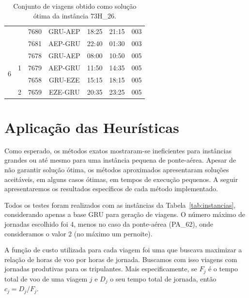 \begin{table}[htb]
\begin{center}
{\begin{tabular}{|c|c|ccccc|}
			&	&	7680 & GRU-AEP & 18:25 & 21:15 & 003 \\
			&	&	7681 & AEP-GRU & 22:40 & 01:30 & 003 \\ \hline \hline
			\multirow{4}{*}{6} & \multirow{3}{*}{1}  
				& 7678 & GRU-AEP & 08:00 & 10:50 & 005 \\
			& & 7679 & AEP-GRU & 11:50 & 14:35 & 005 \\
			&	& 7658 & GRU-EZE & 15:15 & 18:15 & 005 \\ \cline{2-7}
                           	 & \multirow{1}{*}{2}
				& 7659 & EZE-GRU & 20:35 & 23:25 & 005 \\ \hline
		\end{tabular}}
		\caption{Conjunto de viagens obtido como solução ótima da instância 73H\_26.}
		\label{tab:pairings}
	\end{center}
\end{table}


\section{Aplicação das Heurísticas}
\label{sec:aplicacao_heuristicas}

Como esperado, os métodos exatos mostraram-se ineficientes para instâncias grandes ou até mesmo para
uma instância pequena de ponte-aérea. Apesar de não garantir solução ótima, os métodos aproximados
apresentaram soluções aceitáveis, em alguns casos ótimas, em tempos de execução pequenos. A seguir
apresentaremos os resultados específicos de cada método implementado.

Todos os testes foram realizados com as instâncias da Tabela~\ref{tab:instancias}, considerando
apenas a base GRU para geração de viagens. O número máximo de jornadas escolhido foi 4, menos
no caso da ponte-aérea (PA\_62), onde consideramos o valor 2 (no máximo um pernoite).

A função de custo utilizada para cada viagem foi uma que buscava maximizar a relação de horas de voo
por horas de jornada. Buscamos com isso viagens com jornadas produtivas para os tripulantes. Mais
especificamente, se $F_j$ é o tempo total de voo de uma viagem $j$ e $D_j$ o seu tempo total de
jornada, então $c_j = D_j / F_j$.


